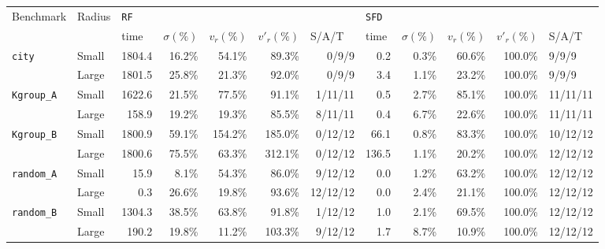 \documentclass[review]{elsarticle}
\theoremstyle{definition}
\begin{document}
\begin{table}[htbp]
\begin{center}
\begin{tabular}{|l|l|*{5}{r}|*{5}{r}}
\hline
\multirow{2}{*}{Benchmark} & \multirow{2}{*}{Radius} & \multicolumn{5}{l|}{\texttt{RF}}                                                                                 	& \multicolumn{5}{l|}{\texttt{SFD}}                                      	\\ \cline{3-12}
                       	& & \multicolumn{1}{l|}{time} & \multicolumn{1}{l|}{$\sigma(\%)$} & \multicolumn{1}{l|}{$v_r(\%)$} &
                       	\multicolumn{1}{l|}{$v'_r(\%)$} &\multicolumn{1}{l|}{S/A/T} & \multicolumn{1}{l|}{time} & \multicolumn{1}{l|}{$\sigma(\%)$} & \multicolumn{1}{l|}{$v_r(\%)$} &
                       	\multicolumn{1}{l|}{$v'_r(\%)$} &\multicolumn{1}{l|}{S/A/T}  \\ \hline
\multirow{2}{*}{\texttt{city}}&Small & 1804.4 & 16.2\% & 54.1\% & 89.3\% & 0/9/9 & 0.2 & 0.3\% & 60.6\% & 100.0\% & \multicolumn{1}{l|}{9/9/9} \\
&Large & 1801.5 & 25.8\% & 21.3\% & 92.0\% & 0/9/9 & 3.4 & 1.1\% & 23.2\% & 100.0\% & \multicolumn{1}{l|}{9/9/9} \\ \cline{1-1}
\multirow{2}{*}{\texttt{Kgroup\_A}}&Small & 1622.6 & 21.5\% & 77.5\% & 91.1\% & 1/11/11 & 0.5 & 2.7\% & 85.1\% & 100.0\% & \multicolumn{1}{l|}{11/11/11} \\
&Large & 158.9 & 19.2\% & 19.3\% & 85.5\% & 8/11/11 & 0.4 & 6.7\% & 22.6\% & 100.0\% & \multicolumn{1}{l|}{11/11/11} \\ \cline{1-1}
\multirow{2}{*}{\texttt{Kgroup\_B}}&Small & 1800.9 & 59.1\% & 154.2\% & 185.0\% & 0/12/12 & 66.1 & 0.8\% & 83.3\% & 100.0\% & \multicolumn{1}{l|}{10/12/12} \\
&Large & 1800.6 & 75.5\% & 63.3\% & 312.1\% & 0/12/12 & 136.5 & 1.1\% & 20.2\% & 100.0\% & \multicolumn{1}{l|}{12/12/12} \\ \cline{1-1}
\multirow{2}{*}{\texttt{random\_A}}&Small & 15.9 & 8.1\% & 54.3\% & 86.0\% & 9/12/12 & 0.0 & 1.2\% & 63.2\% & 100.0\% & \multicolumn{1}{l|}{12/12/12} \\
&Large & 0.3 & 26.6\% & 19.8\% & 93.6\% & 12/12/12 & 0.0 & 2.4\% & 21.1\% & 100.0\% & \multicolumn{1}{l|}{12/12/12} \\ \cline{1-1}
\multirow{2}{*}{\texttt{random\_B}}&Small & 1304.3 & 38.5\% & 63.8\% & 91.8\% & 1/12/12 & 1.0 & 2.1\% & 69.5\% & 100.0\% & \multicolumn{1}{l|}{12/12/12} \\
&Large & 190.2 & 19.8\% & 11.2\% & 103.3\% & 9/12/12 & 1.7 & 8.7\% & 10.9\% & 100.0\% & \multicolumn{1}{l|}{12/12/12} \\ \cline{1-12}

\end{tabular}
\end{center}
\end{table}
\end{document}

